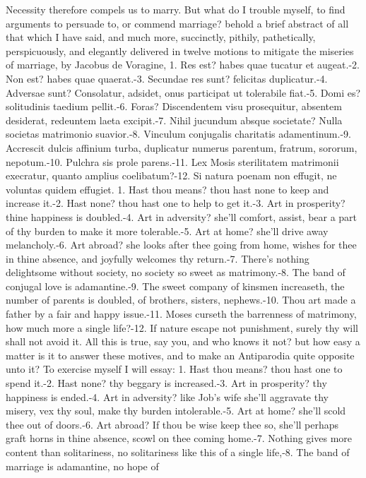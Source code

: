 {Necessity therefore compels us to marry.
But what do I trouble myself, to find arguments to persuade to, or
commend marriage? behold a brief abstract of all that which I have
said, and much more, succinctly, pithily, pathetically, perspicuously,
and elegantly delivered in twelve motions to mitigate the miseries of
marriage, by  Jacobus de Voragine,
1. Res est? habes quae tucatur et augeat.-2. Non est? habes quae
quaerat.-3. Secundae res sunt? felicitas duplicatur.-4. Adversae sunt?
Consolatur, adsidet, onus participat ut tolerabile fiat.-5. Domi es?
solitudinis taedium pellit.-6. Foras? Discendentem visu prosequitur,
absentem desiderat, redeuntem laeta excipit.-7. Nihil jucundum absque
societate? Nulla societas matrimonio suavior.-8. Vinculum conjugalis
charitatis adamentinum.-9. Accrescit dulcis affinium turba, duplicatur
numerus parentum, fratrum, sororum, nepotum.-10. Pulchra sis prole
parens.-11. Lex Mosis sterilitatem matrimonii execratur, quanto amplius
coelibatum?-12. Si natura poenam non effugit, ne voluntas quidem
effugiet.
1. Hast thou means? thou hast none to keep and increase it.-2. Hast
none? thou hast one to help to get it.-3. Art in prosperity? thine
happiness is doubled.-4. Art in adversity? she'll comfort, assist, bear
a part of thy burden to make it more tolerable.-5. Art at home? she'll
drive away melancholy.-6. Art abroad? she looks after thee going from
home, wishes for thee in thine absence, and joyfully welcomes thy
return.-7. There's nothing delightsome without society, no society so
sweet as matrimony.-8. The band of conjugal love is adamantine.-9. The
sweet company of kinsmen increaseth, the number of parents is doubled,
of brothers, sisters, nephews.-10. Thou art made a father by a fair and
happy issue.-11. Moses curseth the barrenness of matrimony, how much
more a single life?-12. If nature escape not punishment, surely thy
will shall not avoid it.
All this is true, say you, and who knows it not? but how easy a matter
is it to answer these motives, and to make an Antiparodia quite
opposite unto it? To exercise myself I will essay:
1. Hast thou means? thou hast one to spend it.-2. Hast none? thy
beggary is increased.-3. Art in prosperity? thy happiness is ended.-4.
Art in adversity? like Job's wife she'll aggravate thy misery, vex thy
soul, make thy burden intolerable.-5. Art at home? she'll scold thee
out of doors.-6. Art abroad? If thou be wise keep thee so, she'll
perhaps graft horns in thine absence, scowl on thee coming home.-7.
Nothing gives more content than solitariness, no solitariness like this
of a single life,-8. The band of marriage is adamantine, no hope of
}
